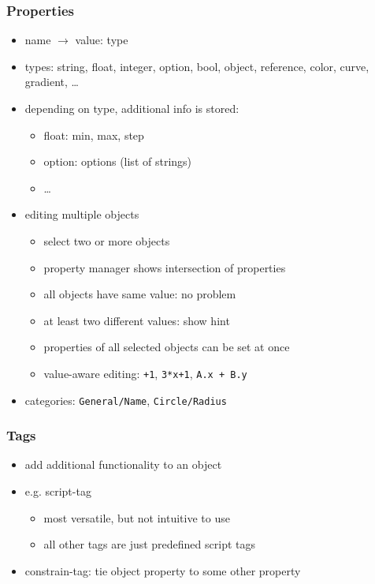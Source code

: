\documentclass{beamer}
\begin{document}
  \begin{frame}[t]\frametitle{Properties}
    \begin{itemize}
      \item name $\rightarrow$ value: type
      \item types: string, float, integer, option, bool, object, reference, color, curve, gradient, \dots
      \item depending on type, additional info is stored:
      \begin{itemize}
        \item float: min, max, step
        \item option: options (list of strings)
        \item \dots
      \end{itemize}
      \item editing multiple objects
      \begin{itemize}
        \item select two or more objects
        \item property manager shows intersection of properties
        \item all objects have same value: no problem
        \item at least two different values: show hint
        \item properties of all selected objects can be set at once
        \item value-aware editing: \texttt{+1}, \texttt{3*x+1}, \texttt{A.x + B.y}
      \end{itemize}
      \item categories: \texttt{General/Name}, \texttt{Circle/Radius}
    \end{itemize}
  \end{frame}

  \begin{frame}[t]\frametitle{Tags}
    \begin{itemize}
      \item add additional functionality to an object
      \item e.g. script-tag
      \begin{itemize}
        \item most versatile, but not intuitive to use
        \item all other tags are just predefined script tags
      \end{itemize}
      \item constrain-tag: tie object property to some other property
    \end{itemize}
  \end{frame}
\end{document}
